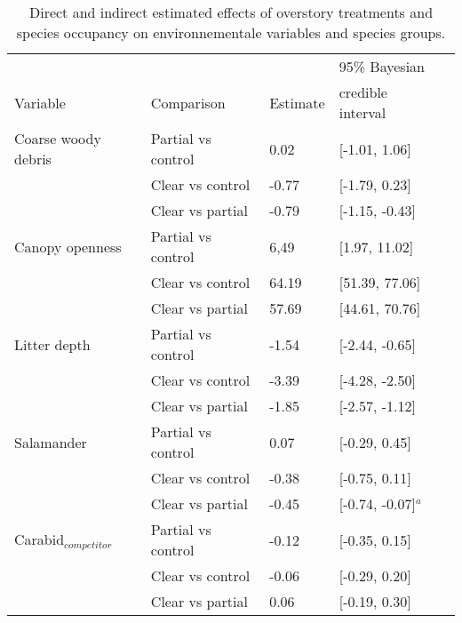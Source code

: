\begin{table}[ht!]
  \centering
  \caption[Direct and indirect estimated effects of overstory treatments and species occupancy on environnementale variables and species groups.]
  {Direct and indirect estimated effects of overstory treatments and species occupancy on environnementale variables and species groups.}
  \label{tab:overstory}
  \begin{tabular}{lllll} 
      \hline
      &&&95\% Bayesian \\
      Variable & Comparison & Estimate &  credible interval \\ [0.5ex] 
      \hline
      Coarse woody debris & Partial vs control & \hspace{1mm}0.02 & [-1.01, 1.06] \\ 
                          & Clear vs control  & -0.77 & [-1.79, 0.23] \\ 
                          & Clear vs partial  & -0.79 & [-1.15, -0.43] \\
      Canopy openness     & Partial vs control & \hspace{1mm}6,49 & [1.97, 11.02] \\ 
                          & Clear vs control  & \hspace{1mm}64.19 & [51.39, 77.06] \\ 
                          & Clear vs partial  & \hspace{1mm}57.69 & [44.61, 70.76] \\ 
      Litter depth        & Partial vs control & -1.54 & [-2.44, -0.65] \\ 
                          & Clear vs control  & -3.39 & [-4.28, -2.50] \\ 
                          & Clear vs partial  & -1.85 & [-2.57, -1.12] \\       
      Salamander          & Partial vs control & \hspace{1mm}0.07 & [-0.29, 0.45] \\ 
                          & Clear vs control  & -0.38 & [-0.75, 0.11] \\ 
                          & Clear vs partial  & -0.45 & [-0.74, -0.07]$^{a}$ \\       
      Carabid$_{competitor}$ & Partial vs control & -0.12 & [-0.35, 0.15] \\
                          & Clear vs control  & -0.06 & [-0.29, 0.20] \\ 
                          & Clear vs partial  & \hspace{1mm}0.06 & [-0.19, 0.30] \\ 

\end{tabular}
\end{table}
